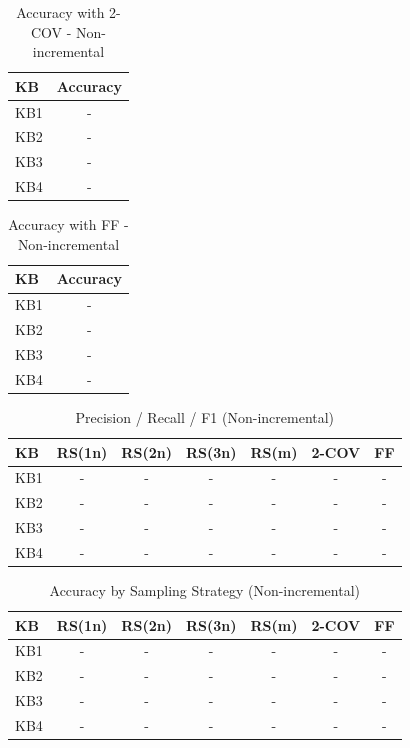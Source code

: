 \begin{table}[htbp]
\centering
\caption{Accuracy with 2-COV - Non-incremental}
\label{tab:table10_non-incremental}
\begin{tabular}{lc}
\toprule
KB & Accuracy \\
\midrule
KB1 & - \\
KB2 & - \\
KB3 & - \\
KB4 & - \\
\bottomrule
\end{tabular}
\end{table}

\begin{table}[htbp]
\centering
\caption{Accuracy with FF - Non-incremental}
\label{tab:table11_non-incremental}
\begin{tabular}{lc}
\toprule
KB & Accuracy \\
\midrule
KB1 & - \\
KB2 & - \\
KB3 & - \\
KB4 & - \\
\bottomrule
\end{tabular}
\end{table}

\begin{table}[htbp]
\centering
\caption{Precision / Recall / F1 (Non-incremental)}
\label{tab:fold_metrics_non-incremental}
\begin{tabular}{lcccccc}
\toprule
KB & RS(1n) & RS(2n) & RS(3n) & RS(m) & 2-COV & FF \\
\midrule
KB1 & - & - & - & - & - & - \\
KB2 & - & - & - & - & - & - \\
KB3 & - & - & - & - & - & - \\
KB4 & - & - & - & - & - & - \\
\bottomrule
\end{tabular}
\end{table}

\begin{table}[htbp]
\centering
\caption{Accuracy by Sampling Strategy (Non-incremental)}
\label{tab:accuracy_non-incremental}
\begin{tabular}{lcccccc}
\toprule
KB & RS(1n) & RS(2n) & RS(3n) & RS(m) & 2-COV & FF \\
\midrule
KB1 & - & - & - & - & - & - \\
KB2 & - & - & - & - & - & - \\
KB3 & - & - & - & - & - & - \\
KB4 & - & - & - & - & - & - \\
\bottomrule
\end{tabular}
\end{table}

